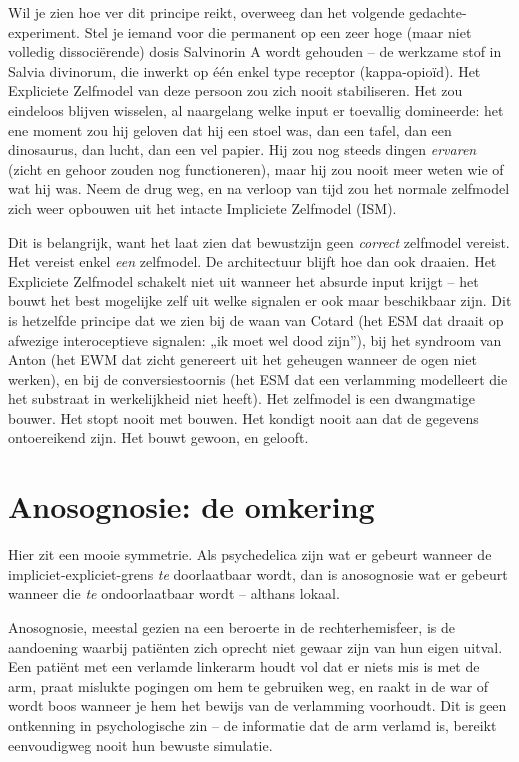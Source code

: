 \documentclass[11pt, twoside, openright]{book}
\begin{document}
Wil je zien hoe ver dit principe reikt, overweeg dan het volgende gedachte-experiment. Stel je iemand voor die permanent op een zeer hoge (maar niet volledig dissociërende) dosis Salvinorin A wordt gehouden -- de werkzame stof in Salvia divinorum, die inwerkt op één enkel type receptor (kappa-opioïd). Het Expliciete Zelfmodel van deze persoon zou zich nooit stabiliseren. Het zou eindeloos blijven wisselen, al naargelang welke input er toevallig domineerde: het ene moment zou hij geloven dat hij een stoel was, dan een tafel, dan een dinosaurus, dan lucht, dan een vel papier. Hij zou nog steeds dingen \textit{ervaren} (zicht en gehoor zouden nog functioneren), maar hij zou nooit meer weten wie of wat hij was. Neem de drug weg, en na verloop van tijd zou het normale zelfmodel zich weer opbouwen uit het intacte Impliciete Zelfmodel (ISM).

Dit is belangrijk, want het laat zien dat bewustzijn geen \textit{correct} zelfmodel vereist. Het vereist enkel \textit{een} zelfmodel. De architectuur blijft hoe dan ook draaien. Het Expliciete Zelfmodel schakelt niet uit wanneer het absurde input krijgt -- het bouwt het best mogelijke zelf uit welke signalen er ook maar beschikbaar zijn. Dit is hetzelfde principe dat we zien bij de waan van Cotard (het ESM dat draait op afwezige interoceptieve signalen: „ik moet wel dood zijn”), bij het syndroom van Anton (het EWM dat zicht genereert uit het geheugen wanneer de ogen niet werken), en bij de conversiestoornis (het ESM dat een verlamming modelleert die het substraat in werkelijkheid niet heeft). Het zelfmodel is een dwangmatige bouwer. Het stopt nooit met bouwen. Het kondigt nooit aan dat de gegevens ontoereikend zijn. Het bouwt gewoon, en gelooft.

\section*{Anosognosie: de omkering}

Hier zit een mooie symmetrie. Als psychedelica zijn wat er gebeurt wanneer de impliciet-expliciet-grens \textit{te} doorlaatbaar wordt, dan is anosognosie wat er gebeurt wanneer die \textit{te} ondoorlaatbaar wordt -- althans lokaal.

Anosognosie, meestal gezien na een beroerte in de rechterhemisfeer, is de aandoening waarbij patiënten zich oprecht niet gewaar zijn van hun eigen uitval. Een patiënt met een verlamde linkerarm houdt vol dat er niets mis is met de arm, praat mislukte pogingen om hem te gebruiken weg, en raakt in de war of wordt boos wanneer je hem het bewijs van de verlamming voorhoudt. Dit is geen ontkenning in psychologische zin -- de informatie dat de arm verlamd is, bereikt eenvoudigweg nooit hun bewuste simulatie.
\end{document}
